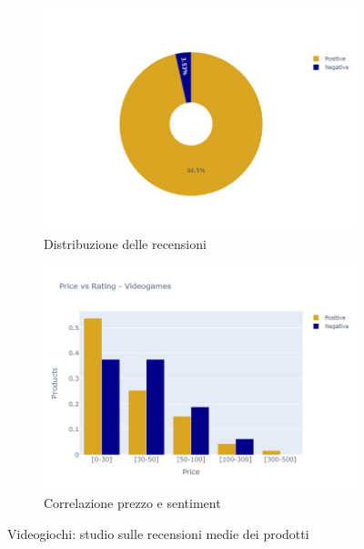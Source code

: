 				\begin{figure} [h]
					\centering
					\begin{subfigure}{0.48\textwidth}
						\includegraphics[width=\textwidth]{Figure/pie_videogames}
						\caption{Distribuzione delle recensioni}
						\label{fig:pie_videogames}
					\end{subfigure}
					\begin{subfigure}{0.48\textwidth}
						\includegraphics[width=\textwidth]{Figure/priceVSrating_videogames}
						\caption{Correlazione prezzo e sentiment}
						\label{fig:priceVSrating_videogames}
					\end{subfigure}
					\caption{Videogiochi: studio sulle recensioni medie dei prodotti}\label{fig:price_raiting_videogames}
				\end{figure}
		
